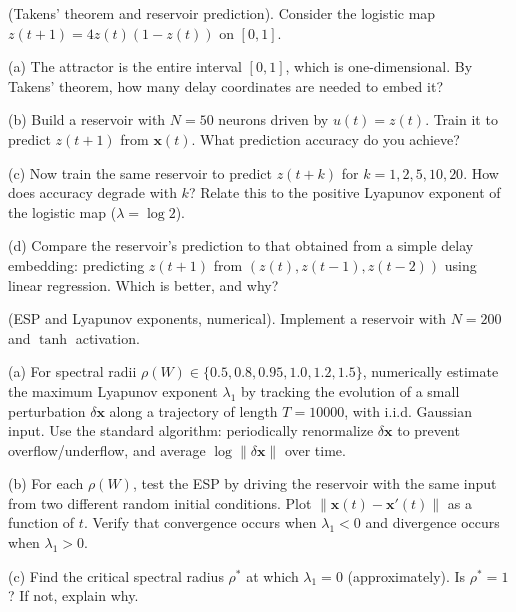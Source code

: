 \begin{exercise}
(Takens' theorem and reservoir prediction). Consider the logistic map $z(t+1) = 4 z(t)(1 - z(t))$ on $[0,1]$.

(a) The attractor is the entire interval $[0,1]$, which is one-dimensional. By Takens' theorem, how many delay coordinates are needed to embed it?

(b) Build a reservoir with $N = 50$ neurons driven by $u(t) = z(t)$. Train it to predict $z(t+1)$ from $\mathbf{x}(t)$. What prediction accuracy do you achieve?

(c) Now train the same reservoir to predict $z(t+k)$ for $k = 1, 2, 5, 10, 20$. How does accuracy degrade with $k$? Relate this to the positive Lyapunov exponent of the logistic map ($\lambda = \log 2$).

(d) Compare the reservoir's prediction to that obtained from a simple delay embedding: predicting $z(t+1)$ from $(z(t), z(t-1), z(t-2))$ using linear regression. Which is better, and why?
\end{exercise}


\begin{exercise}
(ESP and Lyapunov exponents, numerical). Implement a reservoir with $N = 200$ and $\tanh$ activation.

(a) For spectral radii $\rho(W) \in \{0.5, 0.8, 0.95, 1.0, 1.2, 1.5\}$, numerically estimate the maximum Lyapunov exponent $\lambda_1$ by tracking the evolution of a small perturbation $\delta \mathbf{x}$ along a trajectory of length $T = 10000$, with i.i.d. Gaussian input. Use the standard algorithm: periodically renormalize $\delta \mathbf{x}$ to prevent overflow/underflow, and average $\log \|\delta \mathbf{x}\|$ over time.

(b) For each $\rho(W)$, test the ESP by driving the reservoir with the same input from two different random initial conditions. Plot $\|\mathbf{x}(t) - \mathbf{x}'(t)\|$ as a function of $t$. Verify that convergence occurs when $\lambda_1 < 0$ and divergence occurs when $\lambda_1 > 0$.

(c) Find the critical spectral radius $\rho^*$ at which $\lambda_1 = 0$ (approximately). Is $\rho^* = 1$? If not, explain why.
\end{exercise}


